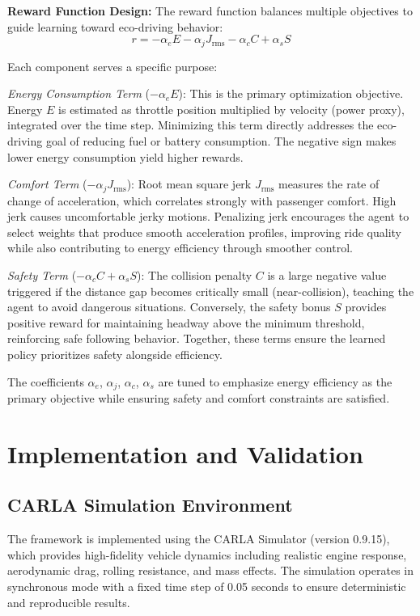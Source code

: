 \documentclass[conference,onecolumn,draftclsnofoot]{IEEEtran}
\begin{document}
\textbf{Reward Function Design:} The reward function balances multiple objectives to guide learning toward eco-driving behavior:
\begin{equation}
r = -\alpha_e E - \alpha_j J_{\text{rms}} - \alpha_c C + \alpha_s S
\end{equation}

Each component serves a specific purpose:

\textit{Energy Consumption Term} ($-\alpha_e E$): This is the primary optimization objective. Energy $E$ is estimated as throttle position multiplied by velocity (power proxy), integrated over the time step. Minimizing this term directly addresses the eco-driving goal of reducing fuel or battery consumption. The negative sign makes lower energy consumption yield higher rewards.

\textit{Comfort Term} ($-\alpha_j J_{\text{rms}}$): Root mean square jerk $J_{\text{rms}}$ measures the rate of change of acceleration, which correlates strongly with passenger comfort. High jerk causes uncomfortable jerky motions. Penalizing jerk encourages the agent to select weights that produce smooth acceleration profiles, improving ride quality while also contributing to energy efficiency through smoother control.

\textit{Safety Term} ($-\alpha_c C + \alpha_s S$): The collision penalty $C$ is a large negative value triggered if the distance gap becomes critically small (near-collision), teaching the agent to avoid dangerous situations. Conversely, the safety bonus $S$ provides positive reward for maintaining headway above the minimum threshold, reinforcing safe following behavior. Together, these terms ensure the learned policy prioritizes safety alongside efficiency.

The coefficients $\alpha_e$, $\alpha_j$, $\alpha_c$, $\alpha_s$ are tuned to emphasize energy efficiency as the primary objective while ensuring safety and comfort constraints are satisfied.

\section{Implementation and Validation}

\subsection{CARLA Simulation Environment}

The framework is implemented using the CARLA Simulator (version 0.9.15), which provides high-fidelity vehicle dynamics including realistic engine response, aerodynamic drag, rolling resistance, and mass effects. The simulation operates in synchronous mode with a fixed time step of 0.05 seconds to ensure deterministic and reproducible results.
\end{document}
